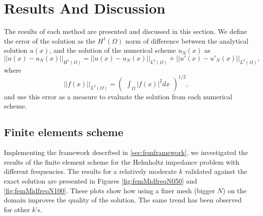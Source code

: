 \section{Results And Discussion}\label{sec:results}
The results of each method are presented and discussed in this section. We define the error of the solution as the $H^1{(\Omega)}$ norm of difference between the analytical solution $u(x)$, and the solution of the numerical scheme $u_N(x)$ as
\begin{equation}
    \label{eq:H1error}
    ||u(x) - u_N(x)||_{H^1{(\Omega)}} = ||u(x) - u_N(x)||_{L^2{(\Omega)}} + ||u'(x) - u'_N(x)||_{L^2{(\Omega)}},
\end{equation}
where
\begin{equation}
    \label{eq:L2error}
    ||f(x)||_{L^2{(\Omega)}} = \begin{pmatrix} \int_{\Omega}{|f(x)|^2dx} \end{pmatrix}^{1/2},
\end{equation}
and use this error as a measure to evaluate the solution from each numerical scheme.

\subsection{Finite elements scheme}\label{sec:femresults}
Implementing the framework described in \autoref{sec:femframework}, we investigated the results of the finite element scheme for the Helmholtz impedance problem with different frequencies. The results for a relatively moderate $k$ validated against the exact solution are presented in Figures \ref{fig:femMidfreqN050} and \ref{fig:femMidfreqN100}. These plots show how using a finer mesh (bigger $N$) on the domain improves the quality of the solution. The same trend has been observed for other $k$'s.


